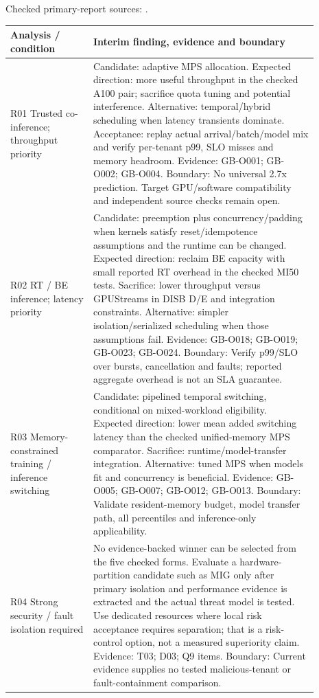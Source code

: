 \documentclass[12pt,a4paper]{article}
\begin{document}
Checked primary-report sources: \cite{vastpipe,igniter,gpulets,pipeswitch,reef}. 
\begin{longtable}{p{0.24\linewidth}p{0.65\linewidth}}
\toprule
Analysis /\allowbreak{} condition & Interim finding, evidence and boundary\\\midrule
\endhead
R01 Trusted co-inference; throughput priority & Candidate: adaptive MPS allocation. Expected direction: more useful throughput in the checked A100 pair; sacrifice quota tuning and potential interference. Alternative: temporal/\allowbreak{}hybrid scheduling when latency transients dominate. Acceptance: replay actual arrival/\allowbreak{}batch/\allowbreak{}model mix and verify per-tenant p99, SLO misses and memory headroom. Evidence: GB-O001; GB-O002; GB-O004. Boundary: No universal 2.7x prediction. Target GPU/\allowbreak{}software compatibility and independent source checks remain open.\\
R02 RT /\allowbreak{} BE inference; latency priority & Candidate: preemption plus concurrency/\allowbreak{}padding when kernels satisfy reset/\allowbreak{}idempotence assumptions and the runtime can be changed. Expected direction: reclaim BE capacity with small reported RT overhead in the checked MI50 tests. Sacrifice: lower throughput versus GPUStreams in DISB D/\allowbreak{}E and integration constraints. Alternative: simpler isolation/\allowbreak{}serialized scheduling when those assumptions fail. Evidence: GB-O018; GB-O019; GB-O023; GB-O024. Boundary: Verify p99/\allowbreak{}SLO over bursts, cancellation and faults; reported aggregate overhead is not an SLA guarantee.\\
R03 Memory-constrained training /\allowbreak{} inference switching & Candidate: pipelined temporal switching, conditional on mixed-workload eligibility. Expected direction: lower mean added switching latency than the checked unified-memory MPS comparator. Sacrifice: runtime/\allowbreak{}model-transfer integration. Alternative: tuned MPS when models fit and concurrency is beneficial. Evidence: GB-O005; GB-O007; GB-O012; GB-O013. Boundary: Validate resident-memory budget, model transfer path, all percentiles and inference-only applicability.\\
R04 Strong security /\allowbreak{} fault isolation required & No evidence-backed winner can be selected from the five checked forms. Evaluate a hardware-partition candidate such as MIG only after primary isolation and performance evidence is extracted and the actual threat model is tested. Use dedicated resources where local risk acceptance requires separation; that is a risk-control option, not a measured superiority claim. Evidence: T03; D03; Q9 items. Boundary: Current evidence supplies no tested malicious-tenant or fault-containment comparison.\\

\end{longtable}
\end{document}

